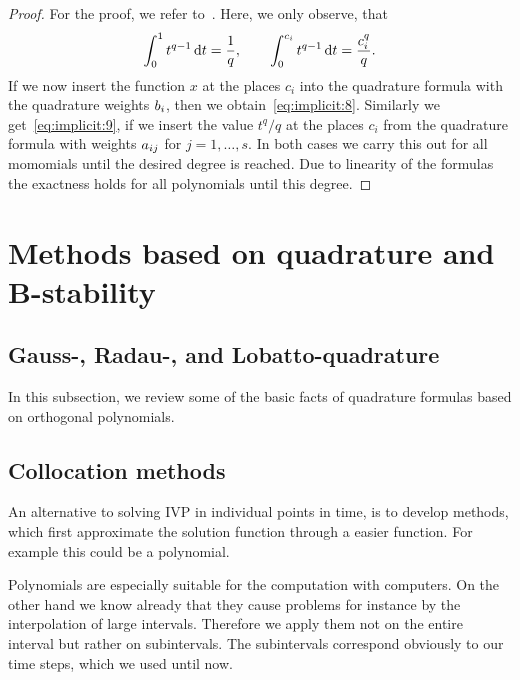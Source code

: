 


\begin{proof}
  For the proof, we refer to~\cite[Ch. II, Theorem
  7.4]{HairerNorsettWanner93}. Here, we only observe, that
  \begin{gather*}
    \int_0^1 t^{q-1} \,\mathrm{d} t = \frac1{q}, \qquad
    \int_0^{c_i} t^{q-1} \,\mathrm{d} t = \frac{c_i^{q}}{q}.
  \end{gather*}
  If we now insert the function $x$ at the places $c_i$ into the
  quadrature formula with the quadrature weights $b_i$, then we
  obtain~\eqref{eq:implicit:8}. Similarly we get~\eqref{eq:implicit:9}, if we insert the value $t^{q}/q$ at
  the places $c_i$ from the quadrature formula with weights
  $a_{ij}$ for $j=1,\dots,s$. In both cases we carry this out for
  all momomials until the desired degree is reached.  Due to linearity
  of the formulas the exactness holds for all polynomials until this
  degree.
\end{proof}

\section{Methods based on quadrature and B-stability}

\subsection{Gauss-, Radau-, and Lobatto-quadrature}

\begin{intro}
  In this subsection, we review some of the basic facts of quadrature
  formulas based on orthogonal polynomials.
\end{intro}





\subsection{Collocation methods}
\begin{intro}
  An alternative to solving IVP in individual points in time, is to
  develop methods, which first approximate the solution function
  through a easier function. For example this could be a polynomial.
  
  Polynomials are especially suitable for the computation with
  computers.  On the other hand we know already that they cause
  problems for instance by the interpolation of large intervals.
  Therefore we apply them not on the entire interval but rather on
  subintervals. The subintervals correspond obviously to our time
  steps, which we used until now.
\end{intro}

